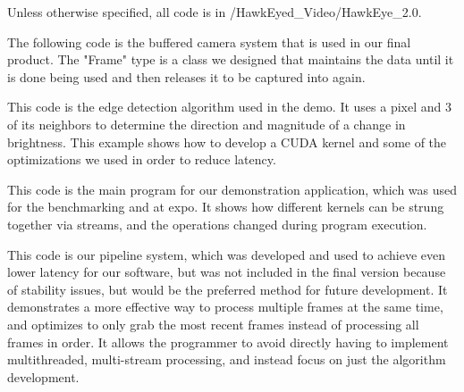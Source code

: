 Unless otherwise specified, all code is in /HawkEyed\_Video/HawkEye\_2.0.\\
\par
The following code is the buffered camera system that is used in our final product.
The "Frame" type is a class we designed that maintains the data until it is done being used
and then releases it to be captured into again.\\

\par
This code is the edge detection algorithm used in the demo. It uses a pixel and 3 of its neighbors
to determine the direction and magnitude of a change in brightness. This example shows how to develop a
CUDA kernel and some of the optimizations we used in order to reduce latency.\\

\par
This code is the main program for our demonstration application, which was used for the benchmarking
and at expo. It shows how different kernels can be strung together via streams, and the operations changed during
program execution.\\

\par
This code is our pipeline system, which was developed and used to achieve even lower latency  for our software, but 
was not included in the final version because of stability issues, but would be the preferred method for future development.
It demonstrates a more effective way to process multiple frames at the same time, and optimizes to only grab the most
recent frames instead of processing all frames in order. It allows the programmer to avoid directly having to implement 
multithreaded, multi-stream processing, and instead focus on just the algorithm development.\\
